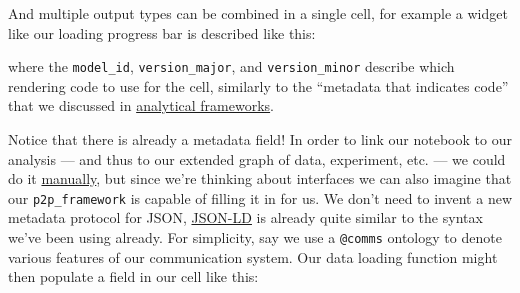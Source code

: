 And multiple output types can be combined in a single cell, for example
a widget like our loading progress bar is described like this:

\begin{Shaded}
\begin{Highlighting}[]
\FunctionTok{\{}
  \FunctionTok{:} \FunctionTok{\{}
    \FunctionTok{:} \FunctionTok{\{}
      \FunctionTok{:} \FunctionTok{,}
      \FunctionTok{:} \FunctionTok{,}
      \FunctionTok{:} 
    \FunctionTok{\},}
    \FunctionTok{:} \OtherTok{[}
    \OtherTok{]}
    \FunctionTok{\},}
    \FunctionTok{:} \FunctionTok{\{\},}
  \FunctionTok{:} 
\FunctionTok{\}}
\end{Highlighting}
\end{Shaded}

where the \texttt{model\_id}, \texttt{version\_major}, and
\texttt{version\_minor} describe which rendering code to use for the
cell, similarly to the ``metadata that indicates code'' that we
discussed in \protect\hyperlink{analytical-frameworks}{analytical
frameworks}.

Notice that there is already a metadata field! In order to link our
notebook to our analysis --- and thus to our extended graph of data,
experiment, etc. --- we could do it
\href{https://jupyterbook.org/en/stable/content/metadata.html}{manually},
but since we're thinking about interfaces we can also imagine that our
\texttt{p2p\_framework} is capable of filling it in for us. We don't
need to invent a new metadata protocol for JSON,
\href{https://json-ld.org/}{JSON-LD} is already quite similar to the
syntax we've been using already. For simplicity, say we use a
\texttt{@comms} ontology to denote various features of our communication
system. Our data loading function might then populate a field in our
cell like this:

\begin{Shaded}
\begin{Highlighting}[]
 \FunctionTok{\{}
  \FunctionTok{:} \FunctionTok{,}
  \FunctionTok{:} 
\FunctionTok{\}}
\end{Highlighting}
\end{Shaded}

